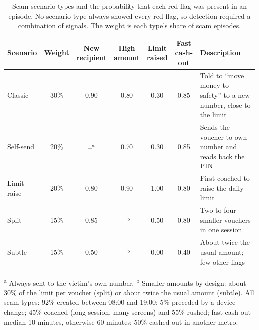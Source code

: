 \begin{table}[htbp]
\centering
\small
\caption{Scam scenario types and the probability that each red flag was present in an episode. No scenario type always showed every red flag, so detection required a combination of signals. The weight is each type's share of scam episodes.}
\label{tab:scam-flags}
\begin{tabularx}{\textwidth}{lccccc>{\raggedright\arraybackslash}X}
\toprule
Scenario & Weight & \makecell{New\\recipient} & \makecell{High\\amount} & \makecell{Limit\\raised} & \makecell{Fast\\cash-out} & Description \\
\midrule
Classic     & 30\% & 0.90 & 0.80 & 0.30 & 0.85 & Told to ``move money to safety'' to a new number, close to the limit \\
Self-send   & 20\% & --\textsuperscript{a} & 0.70 & 0.30 & 0.85 & Sends the voucher to own number and reads back the PIN \\
Limit raise & 20\% & 0.80 & 0.90 & 1.00 & 0.80 & First coached to raise the daily limit \\
Split       & 15\% & 0.85 & --\textsuperscript{b} & 0.50 & 0.80 & Two to four smaller vouchers in one session \\
Subtle      & 15\% & 0.50 & --\textsuperscript{b} & 0.00 & 0.40 & About twice the usual amount; few other flags \\
\bottomrule
\end{tabularx}
\par\smallskip\raggedright\footnotesize
\textsuperscript{a} Always sent to the victim's own number.
\textsuperscript{b} Smaller amounts by design: about 30\% of the limit per voucher (split) or about twice the usual amount (subtle).
All scam types: 92\% created between 08:00 and 19:00; 5\% preceded by a device change; 45\% coached (long session, many screens) and 55\% rushed; fast cash-out median 10 minutes, otherwise 60 minutes; 50\% cashed out in another metro.
\end{table}
